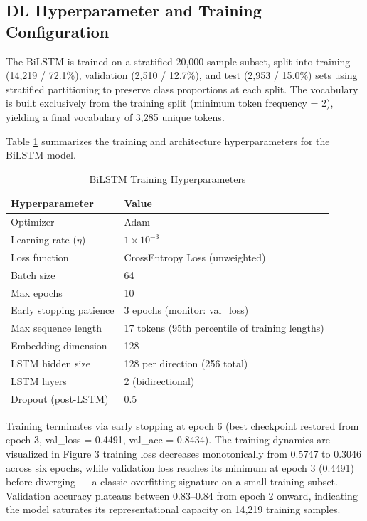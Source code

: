 \documentclass{article}
\begin{document}
\subsection{DL Hyperparameter and Training Configuration}
The BiLSTM is trained on a stratified 20,000-sample subset, split into training (14,219 / 72.1\%), validation (2,510 / 12.7\%), and test (2,953 / 15.0\%) sets using stratified partitioning to preserve class proportions at each split. The vocabulary is built exclusively from the training split (minimum token frequency = 2), yielding a final vocabulary of 3,285 unique tokens.

Table \ref{tab:dl_hyper} summarizes the training and architecture hyperparameters for the BiLSTM model.

\begin{table}[H]
\centering
\caption{BiLSTM Training Hyperparameters}
\label{tab:dl_hyper}
\begin{tabular}{@{}ll@{}}
\toprule
\textbf{Hyperparameter} & \textbf{Value} \\ \midrule
Optimizer & Adam \\
Learning rate ($\eta$) & $1\times10^{-3}$ \\
Loss function & CrossEntropy Loss (unweighted) \\
Batch size & 64 \\
Max epochs & 10 \\
Early stopping patience & 3 epochs (monitor: {val\_loss}) \\
Max sequence length & 17 tokens (95th percentile of training lengths) \\
Embedding dimension & 128 \\
LSTM hidden size & 128 per direction (256 total) \\
LSTM layers & 2 (bidirectional) \\
Dropout (post-LSTM) & 0.5 \\ \bottomrule
\end{tabular}
\end{table}

Training terminates via early stopping at epoch 6 (best checkpoint restored from epoch 3, val\_loss = 0.4491, val\_acc = 0.8434). The training dynamics are visualized in Figure 3 training loss decreases monotonically from 0.5747 to 0.3046 across six epochs, while validation loss reaches its minimum at epoch 3 (0.4491) before diverging — a classic overfitting signature on a small training subset. Validation accuracy plateaus between 0.83–0.84 from epoch 2 onward, indicating the model saturates its representational capacity on 14,219 training samples.
\end{document}
